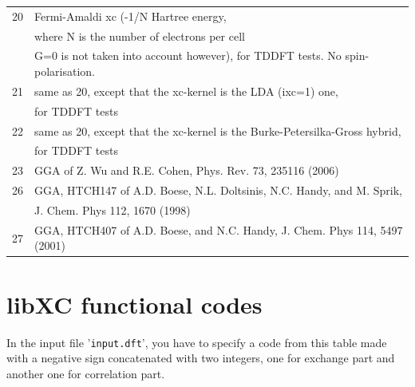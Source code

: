\documentclass[a4paper,11pt]{report}
\begin{document}
\begin{longtable}{ll}
20 & Fermi-Amaldi xc (-1/N Hartree energy, \\
   & where N is the number of electrons per cell\\
   & G=0 is not taken into account however), for TDDFT tests. No spin-polarisation.\\
21 & same as 20, except that the xc-kernel is the LDA (ixc=1) one,\\
   & for TDDFT tests\\
22 & same as 20, except that the xc-kernel is the Burke-Petersilka-Gross hybrid,\\
   & for TDDFT tests\\
23 & GGA of Z. Wu and R.E. Cohen, Phys. Rev. 73, 235116 (2006)\\
26 & GGA, HTCH147 of A.D. Boese, N.L. Doltsinis, N.C. Handy, and M. Sprik,\\
   & J. Chem. Phys 112, 1670 (1998)\\
27 & GGA, HTCH407 of A.D. Boese, and N.C. Handy, J. Chem. Phys 114, 5497 (2001)\\
\end{longtable}

\section{libXC functional codes}
\label{appendix-libXC}

In the input file '\texttt{input.dft}', you have to specify a code from this table made with a negative sign
concatenated with two integers, one for exchange part and another one for correlation part.
\end{document}
